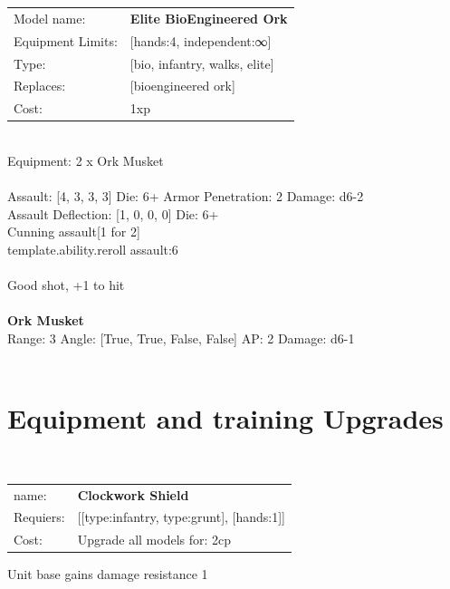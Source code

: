 \ \\
 
\ \\

\noindent
\begin{tabular}{ll}
Model name: &{\bf Elite BioEngineered Ork } \\
Equipment Limits: &[hands:4, independent:∞] \\
Type: &[bio, infantry, walks, elite] \\
Replaces: &[bioengineered ork] \\
Cost: & 1xp\\
\end{tabular}
\ \\
Equipment: 2 x Ork Musket \\
\ \\
Assault: [4, 3, 3, 3] Die: 6+ Armor Penetration: 2 Damage: d6-2 \\
Assault Deflection: [1, 0, 0, 0] Die: 6+\\
\indent Cunning assault[1 for 2]\\ 
{template.ability.reroll assault:6}\\ 
 
\ \\
Good shot, +1 to hit\\ 

\ \\
{\bf Ork Musket } \\



Range: 3  Angle: [True, True, False, False] AP: 2 Damage: d6-1 \\




 
\ \\

\section{Equipment and training Upgrades}\ \\
\begin{tabular}{ll}
name: & {\bf Clockwork Shield } \\
Requiers: & [[type:infantry, type:grunt], [hands:1]] \\
Cost: & Upgrade all models for: 2cp \\
\end{tabular}

Unit base gains damage resistance 1\\ 




